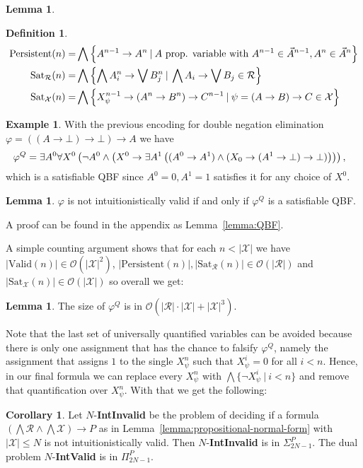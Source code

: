\documentclass{easychair}
\theoremstyle{definition}
\theoremstyle{definition}
\newtheorem{corollary}[theorem]{Corollary}
\theoremstyle{definition}
\newtheorem{lemma}[theorem]{Lemma}
\theoremstyle{definition}
\theoremstyle{definition}
\newtheorem{definition}[theorem]{Definition}
\theoremstyle{definition}
\newtheorem{example}[theorem]{Example}
\theoremstyle{definition}
\begin{document}
\begin{lemma}
\begin{definition}
\begin{align*}
		\text{\normalfont Persistent}(n) = & \bigwedge\left\{A^{n-1}\to A^n\:|\: A \text{ prop. variable with }A^{n-1}\in\vec A^{n-1}, A^n \in\vec A^{n}\right\}\\
		\text{\normalfont Sat}_{\mathcal R}(n) = &\bigwedge\left\{\bigwedge A^n_i\to\bigvee B^n_j\:|\:\bigwedge A_i\to\bigvee B_j \in \mathcal R\right\}\\
		\text{\normalfont Sat}_{\mathcal X}(n) = & \bigwedge\left\{X^{n-1}_\psi\to (A^n\to B^n)\to C^{n-1}\:|\:\psi = (A\to B)\to C\in\mathcal X\right\}
	\end{align*}
\end{definition}

\begin{example}
	With the previous encoding for double negation elimination $\varphi = ((A\to \bot)\to \bot)\to A$ we have
	$$\hspace*{-.3cm}
	\varphi^Q = \exists A^0\forall X^0\left(\neg A^0\wedge\left(X^0\to \exists A^1\left((A^0\to A^1)\wedge(X_0\to (A^1\to \bot)\to \bot)\right)\right)\right),
	$$
	which is a satisfiable QBF since $A^0 = 0, A^1 = 1$ satisfies it for any choice of $X^0$.
\end{example}


\begin{lemma}
	$\varphi$ is not intuitionistically valid if and only if $\varphi^Q$ is a satisfiable QBF.
\end{lemma}
A proof can be found in the appendix as Lemma~\ref{lemma:QBF}.

A simple counting argument shows that for each $n < |\mathcal X|$ we have $|\text{Valid}(n)|\in \mathcal O(|\mathcal X|^2)$, $|\text{Persistent}(n)|, |\text{Sat}_{\mathcal R}(n)|\in \mathcal O(|\mathcal R|)$ and $|\text{Sat}_{\mathcal X}(n)|\in \mathcal O(|\mathcal X|)$ so overall we get:
\begin{lemma}
	The size of $\varphi^Q$ is in $\mathcal O(|\mathcal R|\cdot|\mathcal X| + |\mathcal X|^3)$.
\end{lemma}

Note that the last set of universally quantified variables can be avoided because there is only one assignment that has the chance to falsify $\varphi^Q$, namely the assignment that assigns $1$ to the single $X_\psi^n$ such that $X_\psi^i = 0$ for all $i < n$. Hence, in our final formula we can replace every $X_\psi^n$ with $\bigwedge\{\neg X_\psi^i\:|\:i < n\}$ and remove that quantification over $X_\psi^n$. With that we get the following:

\begin{corollary}
	Let $N$-\textbf{IntInvalid} be the problem of deciding if a formula $(\bigwedge \mathcal R\wedge\bigwedge\mathcal X)\to P$ as in Lemma~\ref{lemma:propositional-normal-form} with $|\mathcal X|\leq N$ is not intuitionistically valid. Then $N$-\textbf{IntInvalid} is in $\Sigma_{2N-1}^P$. The dual problem $N$-\textbf{IntValid} is in $\Pi_{2N-1}^P$.
\end{corollary}



\end{lemma}
\end{document}
